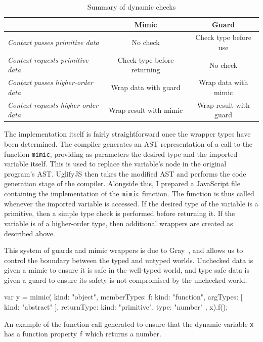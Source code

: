 \documentclass[12pt,a4paper,twoside,openright]{report}
\theoremstyle{definition}
\theoremstyle{dotless}
\begin{document}
\begin{table}[h]
  \begin{tabular}{@{}lcc@{}}
	\toprule
    & \textbf{Mimic} & \textbf{Guard}               \\ \midrule
	\textit{Context passes primitive data}   & No check & Check type before use        \\
	\textit{Context requests primitive data} & Check type before returning & No check \\
	\textit{Context passes higher-order data} & Wrap data with guard & Wrap data with mimic \\
	\textit{Context requests higher-order data} & Wrap result with mimic & Wrap result with guard \\

	\bottomrule
  \end{tabular}
  \caption{Summary of dynamic checks}
  \label{tbl:chkSummary}
\end{table}
The implementation itself is fairly straightforward once the wrapper types 
have been determined. The compiler generates an AST representation of a
call to the function \texttt{mimic}, providing as parameters 
the desired type and the imported variable itself. This is used to replace the 
variable's node in the original program's AST. UglifyJS then takes the modified AST and 
performs the code generation stage of the compiler. Alongside this, I prepared
a JavaScript file containing the implementation of the \texttt{mimic} function. 
The function is thus called whenever the imported variable is accessed. If the
desired type of the variable is a primitive, then a simple type check is performed 
before returning it. If the variable is of a higher-order type, then additional
wrappers are created as described above.

This system of guards and mimic wrappers is due to
Gray~\cite{gradGray,gray2005fine}, and allows us to control the boundary between the typed
and untyped worlds. Unchecked data is given a mimic to ensure it is safe in the
well-typed world, and type safe data is given a guard to ensure its safety is
not compromised by the unchecked world.

\begin{listing}
  \begin{jscript}
	var y = mimic({
	  kind: "object",
	  memberTypes: {
	    f: {
	      kind: "function",
	      argTypes: [ {
	        kind: "abstract"
	      } ],
	      returnType: {
	        kind: "primitive",
	        type: "number"
	      }
	    }
	  }
	}, x).f();
  \end{jscript}
  \caption{An example of the function call generated to ensure that the 
  	dynamic variable \texttt{x} has a function property \texttt{f} which returns a number.}
  \label{lst:importPrim}
\end{listing}
\end{document}
